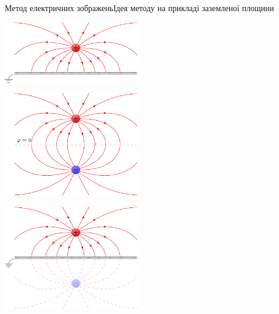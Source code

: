 \documentclass[onlytextwidth]{beamer}
\begin{document}
\begin{frame}{Метод електричних зображень}{Ідея методу на прикладі заземленої площини}
	\begin{overprint}
		\begin{center}
			\includegraphics[width=6cm]{charge_near_plane.pdf}
		\end{center}
		\begin{center}
			\includegraphics[width=6cm]{two_charges.pdf}
		\end{center}
		\begin{center}
			\includegraphics[width=6cm]{charge_image.pdf}
		\end{center}
	\end{overprint}
\end{frame}
\end{document}
